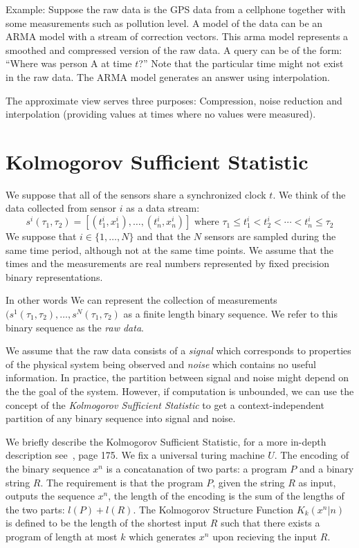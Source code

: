 \documentclass[11pt]{article}
\begin{document}
Example: Suppose the raw data is the GPS data from a cellphone
together with some measurements such as pollution level. A model of
the data can be an ARMA model with a stream of correction
vectors. This arma model represents a smoothed and compressed version
of the raw data. A query can be of the form: ``Where was person A at
time $t$?''  Note that the particular time might not exist in the raw
data. The ARMA model generates an answer using interpolation.

The approximate view serves three purposes: Compression, noise
reduction and interpolation (providing values at times where no values
were measured).

\section{Kolmogorov Sufficient Statistic}

We suppose that all of the sensors share a synchronized clock $t$.
We think of the data collected from sensor $i$ as a data stream:
\[
s^i(\tau_1,\tau_2)=[(t^i_1,x^i_1),\ldots,(t^i_n,x^i_n)]
\mbox{ where } \tau_1\leq t^i_1 < t^i_2<\cdots < t^i_n \leq \tau_2
\]
We suppose that $i \in \{1,\ldots,N\}$ and that the $N$ sensors are
sampled during the same time period, although not at the same time
points. We assume that the times and the measurements are real numbers
represented by fixed precision binary representations.

In other words We can represent the collection of measurements
$(s^1(\tau_1,\tau_2),\ldots,s^N(\tau_1,\tau_2)$ as a finite length
binary sequence. We refer to this binary sequence as the {\em raw
  data}.

We assume that the raw data consists of a {\em signal} which
corresponds to properties of the physical system being observed and
{\em noise} which contains no useful information. In practice, the
partition between signal and noise might depend on the the goal of the
system. However, if computation is unbounded, we can use the concept
of the {\em Kolmogorov Sufficient Statistic} to get a
context-independent partition of any binary sequence into signal and
noise.

We briefly describe the Kolmogorov Sufficient Statistic, for a more
in-depth description see~\cite{CoverThomas}, page 175. We fix a
universal turing machine $U$. The encoding of the binary sequence
$x^n$ is a concatanation of two parts: a program $P$ and a binary
string $R$. The requirement is that the program $P$, given the string
$R$ as input, outputs the sequence $x^n$, the length of the encoding
is the sum of the lengths of the two parts: $l(P)+l(R)$.  The
Kolmogorov Structure Function $K_k(x^n|n)$ is defined to be the length
of the shortest input $R$ such that there exists a program of length
at most $k$ which generates $x^n$ upon recieving the input $R$.
\end{document}
